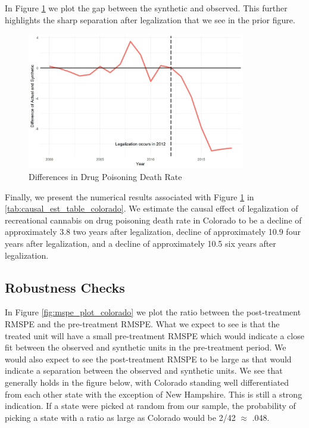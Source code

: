 \documentclass{article}
\begin{document}
In Figure \ref{fig:diffs_plot_colorado} we plot the gap between the synthetic and observed. This further highlights the sharp separation after legalization that we see in the prior figure.

\begin{figure}[H]
	\begin{center}
		\includegraphics[width=0.85\textwidth]{diffs_plot_colorado}
	\end{center}
	\caption{Differences in Drug Poisoning Death Rate}
	\label{fig:diffs_plot_colorado}
\end{figure}

Finally, we present the numerical results associated with Figure \ref{fig:diffs_plot_colorado} in \ref{tab:causal_est_table_colorado}. We estimate the causal effect of legalization of recreational cannabis on drug poisoning death rate in Colorado to be a decline of approximately 3.8 two years after legalization, decline of approximately 10.9 four years after legalization, and a decline of approximately 10.5 six years after legalization.



\subsection{Robustness Checks}

In Figure \ref{fig:mspe_plot_colorado} we plot the ratio between the post-treatment RMSPE and the pre-treatment RMSPE. What we expect to see is that the treated unit will have a small pre-treatment RMSPE which would indicate a close fit between the observed and synthetic units in the pre-treatment period. We would also expect to see the post-treatment RMSPE to be large as that would indicate a separation between the observed and synthetic units. We see that generally holds in the figure below, with Colorado standing well differentiated from each other state with the exception of New Hampshire. This is still a strong indication. If a state were picked at random from our sample, the probability of picking a state with a ratio as large as Colorado would be 2/42 $\approx$ .048.
\end{document}
